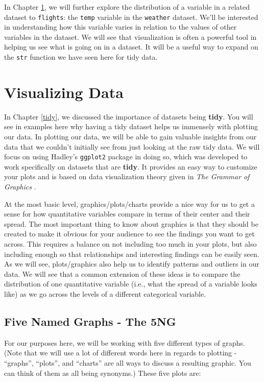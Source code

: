 \documentclass[]{tufte-book}
\begin{document}
In Chapter \ref{viz}, we will further explore the distribution of a
variable in a related dataset to \texttt{flights}: the \texttt{temp}
variable in the \texttt{weather} dataset. We'll be interested in
understanding how this variable varies in relation to the values of
other variables in the dataset. We will see that visualization is often
a powerful tool in helping us see what is going on in a dataset. It will
be a useful way to expand on the \texttt{str} function we have seen here
for tidy data.

\chapter{Visualizing Data}\label{viz}

In Chapter \ref{tidy}, we discussed the importance of datasets being
\textbf{tidy}. You will see in examples here why having a tidy dataset
helps us immensely with plotting our data. In plotting our data, we will
be able to gain valuable insights from our data that we couldn't
initially see from just looking at the raw tidy data. We will focus on
using Hadley's \texttt{ggplot2} package in doing so, which was developed
to work specifically on datasets that are \textbf{tidy}. It provides an
easy way to customize your plots and is based on data visualization
theory given in \emph{The Grammar of Graphics} \citep{wilkinson2005}.

At the most basic level, graphics/plots/charts provide a nice way for us
to get a sense for how quantitative variables compare in terms of their
center and their spread. The most important thing to know about graphics
is that they should be created to make it obvious for your audience to
see the findings you want to get across. This requires a balance on not
including too much in your plots, but also including enough so that
relationships and interesting findings can be easily seen. As we will
see, plots/graphics also help us to identify patterns and outliers in
our data. We will see that a common extension of these ideas is to
compare the distribution of one quantitative variable (i.e., what the
spread of a variable looks like) as we go across the levels of a
different categorical variable.

\section{Five Named Graphs - The 5NG}\label{five-named-graphs---the-5ng}

For our purposes here, we will be working with five different types of
graphs. (Note that we will use a lot of different words here in regards
to plotting - ``graphs'', ``plots'', and ``charts'' are all ways to
discuss a resulting graphic. You can think of them as all being
synonyms.) These five plots are:
\end{document}
